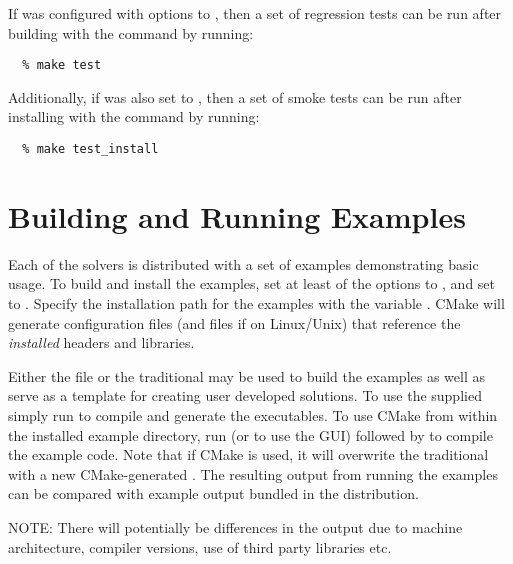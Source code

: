 If {\sundials} was configured with
 options to , then a set of
regression tests can be run after building with the  command
by running: 
\begin{verbatim}
  % make test
\end{verbatim}
Additionally, if  was also set to , then
a set of smoke tests can be run after installing with the  
command by running:
\begin{verbatim}
  % make test_install
\end{verbatim}

\section{Building and Running Examples}
Each of the {\sundials} solvers is distributed with a set of examples
demonstrating basic usage. To build and install the examples, set at
least of the  options to , and
set  to .
Specify the installation path for the examples with the variable . CMake will generate
 configuration files (and  files if on Linux/Unix) that reference the
{\em installed} {\sundials} headers and libraries.

Either the  file or the traditional  may be used to build the examples
as well as serve as a template for creating user developed solutions.
To use the supplied  simply run  to compile and generate the executables.
To use CMake from within the installed example directory, run  (or  to use the GUI)
followed by  to compile the example code.
Note that if CMake is used, it will overwrite the traditional  with a new CMake-generated .
The resulting output from running the examples can be compared with example output bundled
in the {\sundials} distribution.

\noindent NOTE: There will potentially be differences in the output due to machine architecture, compiler versions,
use of third party libraries etc.{\warn} 


